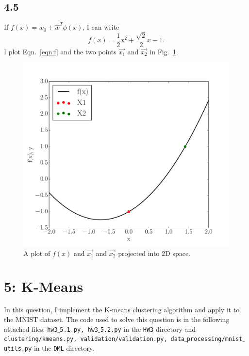 \documentclass[12pt]{amsart}
\begin{document}
\subsection*{4.5}

If $f(x) = w_0 + \hat{w}^T \phi(x)$, I can write
\begin{equation} \label{eqn:f}
f(x) = \frac{1}{2}x^2 + \frac{\sqrt{2}}{2}x - 1.
\end{equation}
I plot Eqn.~\ref{eqn:f} and the two points $\vec{x_1}$ and $\vec{x_2}$ in Fig.~\ref{fig:svm}.

\begin{figure}[H]
	\includegraphics[width=\columnwidth]{svm_by_hand.pdf}
    \caption{A plot of $f(x)$ and $\vec{x_1}$ and $\vec{x_2}$ projected into 2D space.}
    \label{fig:svm}
\end{figure}

\section*{5: K-Means}

In this question, I implement the K-means clustering algorithm and apply it to the MNIST dataset.  The code used to solve this question is in the following attached files: {\tt hw3$\_$5.1.py, hw3$\_$5.2.py} in the {\tt HW3} directory and {\tt clustering/kmeans.py, validation/validation.py, data$\_$processing/mnist$\_$utils.py} in the {\tt DML} directory.
\end{document}
